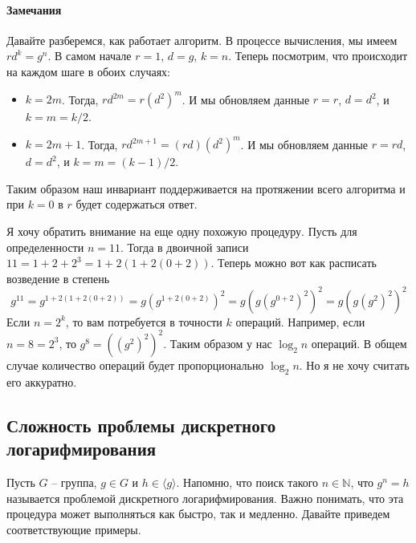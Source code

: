 \paragraph{Замечания}

Давайте разберемся, как работает алгоритм.
В процессе вычисления, мы имеем $r d^k = g^n$.
В самом начале $r = 1$, $d = g$, $k = n$.
Теперь посмотрим, что происходит на каждом шаге в обоих случаях:
\begin{itemize}
\item $k = 2m$.
Тогда, $r d^{2m} = r (d^2)^m$.
И мы обновляем данные $r = r$, $d = d^2$, и $k = m = k/2$.

\item $k = 2m +1$.
Тогда, $r d^{2 m + 1} = (r d) (d^2)^m$.
И мы обновляем данные $r = rd$, $d = d^2$, и $k = m = (k - 1) / 2$.
\end{itemize}
Таким образом наш инвариант поддерживается на протяжении всего алгоритма и при $k = 0$ в $r$ будет содержаться ответ.

Я хочу обратить внимание на еще одну похожую процедуру.
Пусть для определенности $n = 11$.
Тогда в двоичной записи $11 = 1 + 2 + 2^3 = 1 + 2 ( 1 + 2( 0 + 2 ))$.
Теперь можно вот как расписать возведение в степень
\[
g^{11} = g^{1 + 2 ( 1 + 2( 0 + 2 ))} = g (g^{ 1 + 2( 0 + 2 )})^2 =  g (g (g^{ 0 + 2 })^2)^2 =   g (g (g^{ 2 })^2)^2
\]
Если $n = 2^k$, то вам потребуется в точности $k$ операций.
Например, если $n = 8 = 2^3$, то $g^8 = ((g^2)^2)^2$.
Таким образом у нас $\log_2 n$ операций.
В общем случае количество операций будет пропорционально $\log_2 n$.
Но я не хочу считать его аккуратно.

\subsection{Сложность проблемы дискретного логарифмирования}\label{section::DiscreteLog}

Пусть $G$ -- группа, $g\in G$ и $h \in \langle g\rangle$.
Напомню, что поиск такого $n\in \mathbb N$, что $g^n = h$ называется проблемой дискретного логарифмирования.
Важно понимать, что эта процедура может выполняться как быстро, так и медленно.
Давайте приведем соответствующие примеры.

